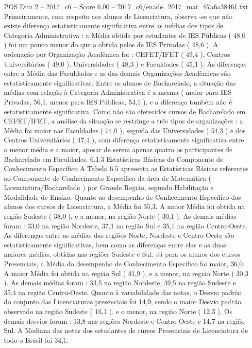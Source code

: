\begin{textsample}{POS Dim 2 – 2017\_c6 – Score 6.00 – 2017\_c6/enade\_2017\_mat\_67a6a38461.txt}
Primeiramente, com respeito aos alunos de Licenciatura, observa -se que não existe diferença estatisticamente significativa entre as médias dos tipos de Categoria Administrativa : a Média obtida por estudantes de IES Públicas ( 48,0 ) foi um pouco menor do que a obtida pelos de IES Privadas ( 48,6 ).
A ordenação por Organização Acadêmica foi : CEFET/IFET ( 49,4 ), Centros Universitários ( 49,0 ), Universidades ( 48,3 ) e Faculdades ( 45,1 ).
As diferenças entre a Média das Faculdades e as das demais Organizações Acadêmicas são estatisticamente significativas.
Entre os alunos de Bacharelado, a situação das médias com relação à Categoria Administrativa é a mesma ( maior para IES Privadas, 56,1, menor para IES Públicas, 54,1 ), e a diferença também não é estatisticamente significativa.
Como não são oferecidos cursos de Bacharelado em CEFET/IFET, a análise da situação se restringe a três tipos de organizações : a Média foi maior nas Faculdades ( 74,0 ), seguida das Universidades ( 54,3 ) e dos Centros Universitários ( 47,4 ), com diferença estatisticamente significativa entre a menor média e a maior, apesar de serem apenas quatro os participantes de Bacharelado em Faculdades. 6.1.3 Estatísticas Básicas do Componente de Conhecimento Específico A Tabela 6.5 apresenta as Estatísticas Básicas referentes ao Componente de Conhecimento Específico da área de Matemática ( Licenciatura/Bacharelado ) por Grande Região, segundo Habilitação e Modalidade de Ensino.
Quanto ao desempenho de Conhecimento Específico dos alunos dos cursos de Licenciatura, a Média foi 35,3.
A maior Média foi obtida na região Sudeste ( 38,0 ), e a menor, na região Norte ( 30,1 ).
As demais médias foram : 33,0 na região Nordeste, 37,1 na região Sul e 35,1 na região Centro-Oeste.
As diferenças entre as médias das regiões Norte, Nordeste e Centro-Oeste são estatisticamente significativas, bem como as diferenças entre elas e as duas maiores médias, obtidas nas regiões Sudeste e Sul.
Já para os alunos dos cursos Presenciais, a Média do desempenho de Conhecimento Específico foi maior, 36,0.
A maior Média foi obtida na região Sul ( 41,9 ), e a menor, na região Norte ( 30,3 ).
As demais médias foram : 33,5 na região Nordeste, 39,5 na região Sudeste e 35,4 na região Centro-Oeste.
Quanto à variabilidade das notas, o Desvio padrão do conjunto das Licenciaturas presenciais foi 14,9, sendo o maior Desvio padrão observado na região Sudeste ( 16,1 ), e o menor, na região Norte ( 12,3 ).
Os demais desvios foram : 13,8 nas regiões Nordeste e Centro-Oeste e 14,7 na região Sul.
A Mediana das notas dos estudantes de cursos Presenciais de Licenciatura de todo o Brasil foi 34,1.

\end{textsample}
